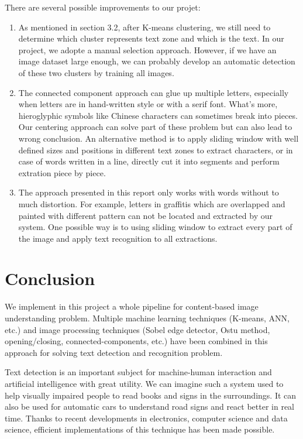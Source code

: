 \documentclass[paper=a4, french, 11pt]{scrartcl}
\begin{document}
There are several possible improvements to our projet:

\begin{enumerate}
\item As mentioned in section 3.2, after K-means clustering, we still need to determine which cluster represents text zone and which is the text. In our project, we adopte a manual selection approach. However, if we have an image dataset large enough, we can probably develop an automatic detection of these two clusters by training all images.

\item The connected component approach can glue up multiple letters, especially when letters are in hand-written style or with a serif font. What's more, hieroglyphic symbols like Chinese characters can sometimes break into pieces. Our centering approach can solve part of these problem but can also lead to wrong conclusion. An alternative method is to apply sliding window with well defined sizes and positions in different text zones to extract characters, or in case of words written in a line, directly cut it into segments and perform extration piece by piece.

\item The approach presented in this report only works with words without to much distortion. For example, letters in graffitis which are overlapped and painted with different pattern can not be located and extracted by our system. One possible way is to using sliding window to extract every part of the image and apply text recognition to all extractions.
   
\end{enumerate}


\section{Conclusion} \mbox{} \vspace{-0.5cm}

We implement in this project a whole pipeline for content-based image understanding problem. Multiple machine learning techniques (K-means, ANN, etc.) and image processing techniques (Sobel edge detector, Ostu method, opening/closing, connected-components, etc.) have been combined in this approach for solving text detection and recognition problem.  

Text detection is an important subject for machine-human interaction and artificial intelligence with great utility. We can imagine such a system used to help visually impaired people to read books and signs in the surroundings. It can also be used for automatic cars to understand road signs and react better in real time. Thanks to recent developments in electronics, computer science and data science, efficient implementations of this technique has been made possible.  



\end{document}
